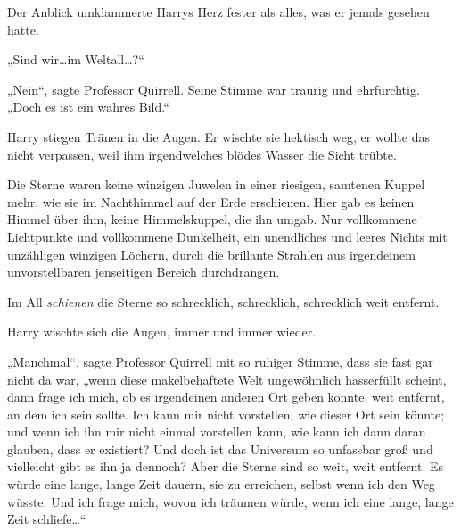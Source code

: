 Der Anblick umklammerte Harrys Herz fester als alles, was er jemals gesehen hatte.

„Sind wir…im Weltall…?“

„Nein“, sagte Professor Quirrell. Seine Stimme war traurig und ehrfürchtig. „Doch es ist ein wahres Bild.“

Harry stiegen Tränen in die Augen. Er wischte sie hektisch weg, er wollte das nicht verpassen, weil ihm irgendwelches blödes Wasser die Sicht trübte.

Die Sterne waren keine winzigen Juwelen in einer riesigen, samtenen Kuppel mehr, wie sie im Nachthimmel auf der Erde erschienen. Hier gab es keinen Himmel über ihm, keine Himmelskuppel, die ihn umgab. Nur vollkommene Lichtpunkte und vollkommene Dunkelheit, ein unendliches und leeres Nichts mit unzähligen winzigen Löchern, durch die brillante Strahlen aus irgendeinem unvorstellbaren jenseitigen Bereich durchdrangen.

Im All \emph{schienen} die Sterne so schrecklich, schrecklich, schrecklich weit entfernt.

Harry wischte sich die Augen, immer und immer wieder.

„Manchmal“, sagte Professor Quirrell mit so ruhiger Stimme, dass sie fast gar nicht da war, „wenn diese makelbehaftete Welt ungewöhnlich hasserfüllt scheint, dann frage ich mich, ob es irgendeinen anderen Ort geben könnte, weit entfernt, an dem ich sein sollte. Ich kann mir nicht vorstellen, wie dieser Ort sein könnte; und wenn ich ihn mir nicht einmal vorstellen kann, wie kann ich dann daran glauben, dass er existiert? Und doch ist das Universum so unfassbar groß und vielleicht gibt es ihn ja dennoch? Aber die Sterne sind so weit, weit entfernt. Es würde eine lange, lange Zeit dauern, sie zu erreichen, selbst wenn ich den Weg wüsste. Und ich frage mich, wovon ich träumen würde, wenn ich eine lange, lange Zeit schliefe…“

